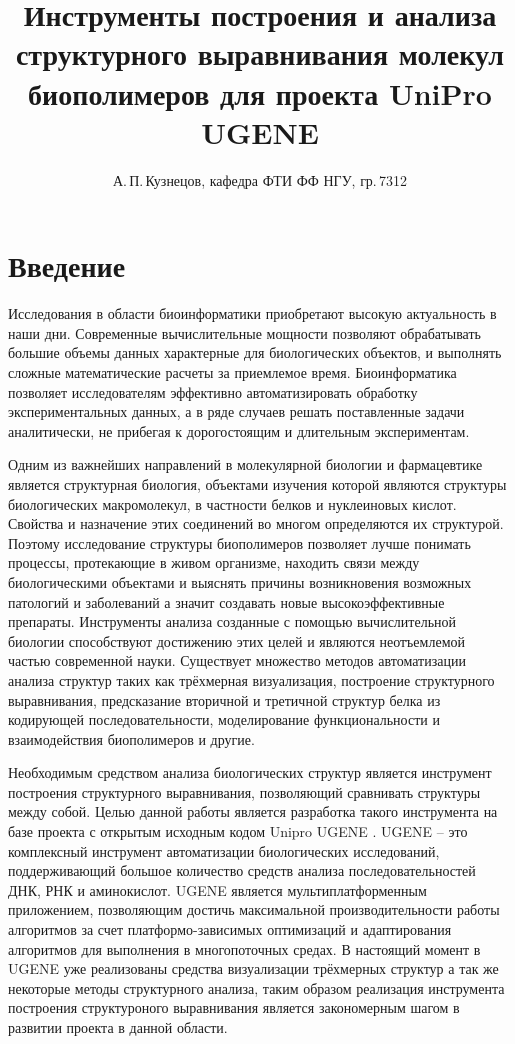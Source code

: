\documentclass[a4paper, 12pt, titlepage, utf8]{extarticle}
\author{А.\,П.\,Кузнецов, кафедра ФТИ ФФ НГУ, гр.\,7312}
\title{Инструменты построения и анализа структурного выравнивания молекул биополимеров для проекта UniPro UGENE}
\let\oldsection\section         %
\renewcommand{\section}{\newpage\oldsection}
\begin{document}


\tableofcontents
\newpage

\section{Введение}	%
Исследования в области биоинформатики приобретают высокую актуальность в наши дни. Современные вычислительные мощности позволяют обрабатывать большие объемы данных характерные для биологических объектов, и выполнять сложные математические расчеты за приемлемое время. Биоинформатика позволяет исследователям эффективно автоматизировать обработку экспериментальных данных, а в ряде случаев решать поставленные задачи аналитически, не прибегая к дорогостоящим и длительным экспериментам.

Одним из важнейших направлений в молекулярной биологии и фармацевтике является структурная биология, объектами изучения которой являются структуры биологических макромолекул, в частности белков и нуклеиновых кислот. Свойства и назначение этих соединений во многом определяются их структурой. Поэтому исследование структуры биополимеров позволяет лучше понимать процессы, протекающие в живом организме, находить связи между биологическими объектами и выяснять причины возникновения возможных патологий и заболеваний а значит создавать новые высокоэффективные препараты. Инструменты анализа созданные с помощью вычислительной биологии способствуют достижению этих целей и являются неотъемлемой частью современной науки. Существует множество методов автоматизации анализа структур таких как трёхмерная визуализация, построение структурного выравнивания, предсказание вторичной и третичной структур белка из кодирующей последовательности, моделирование функциональности и взаимодействия биополимеров и другие.

Необходимым средством анализа биологических структур является инструмент построения структурного выравнивания, позволяющий сравнивать структуры между собой. Целью данной работы является разработка такого инструмента на базе проекта с открытым исходным кодом Unipro UGENE \cite{ugene}. UGENE -- это комплексный инструмент автоматизации биологических исследований, поддерживающий большое количество средств анализа последовательностей ДНК, РНК и аминокислот. UGENE является мультиплатформенным приложением, позволяющим достичь максимальной производительности работы алгоритмов за счет платформо-зависимых оптимизаций и адаптирования алгоритмов для выполнения в многопоточных средах. В настоящий момент в UGENE уже реализованы средства визуализации трёхмерных структур а так же некоторые методы структурного анализа, таким образом реализация инструмента построения структуроного выравнивания является закономерным шагом в развитии проекта в данной области.
\end{document}
